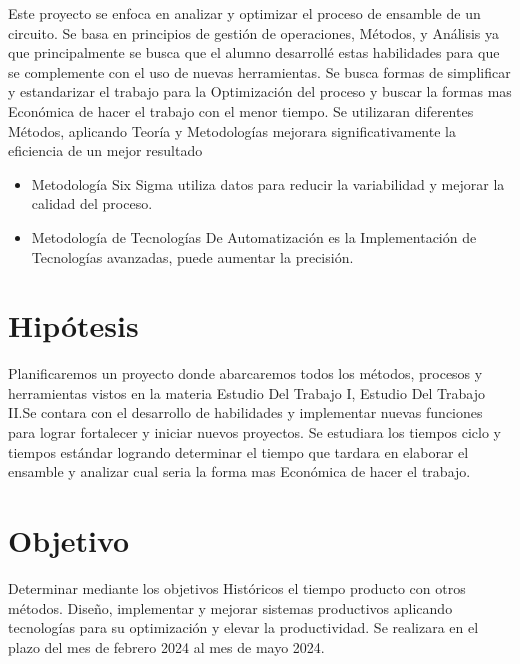     
    Este proyecto se enfoca en analizar y optimizar el proceso de ensamble de un circuito. Se basa en principios de  gestión de operaciones, Métodos, y Análisis  ya que principalmente se busca que el alumno desarrollé estas habilidades para que se complemente con el uso de nuevas herramientas. Se busca formas de simplificar y estandarizar el trabajo para la Optimización del proceso y buscar la formas mas Económica de hacer el trabajo con el menor tiempo. Se utilizaran diferentes Métodos, aplicando Teoría y Metodologías mejorara significativamente la eficiencia de un mejor resultado
    \begin{itemize}
        \item  Metodología Six Sigma utiliza datos para reducir la variabilidad y mejorar la calidad del proceso.\cite{DS}
        \item Metodología de Tecnologías De Automatización es la Implementación de Tecnologías avanzadas, puede aumentar la precisión.\cite{RH}
    \end{itemize}
    
    
    \section{Hipótesis}
    Planificaremos un proyecto donde abarcaremos  todos los métodos, procesos y herramientas  vistos en la materia Estudio Del Trabajo I, Estudio Del Trabajo II.Se contara con el desarrollo de habilidades y implementar nuevas funciones  para lograr fortalecer y iniciar nuevos proyectos.
    Se estudiara los tiempos ciclo y tiempos estándar logrando  determinar el tiempo que tardara en elaborar el ensamble y analizar cual seria la forma mas Económica de hacer el trabajo. 
    
        \section{Objetivo}
        
    Determinar mediante los objetivos Históricos el tiempo producto con otros métodos. 
    Diseño, implementar y mejorar sistemas productivos aplicando tecnologías para su optimización y elevar la productividad.
    Se realizara en el plazo del mes de febrero 2024 al mes de mayo 2024.
    
    
    
